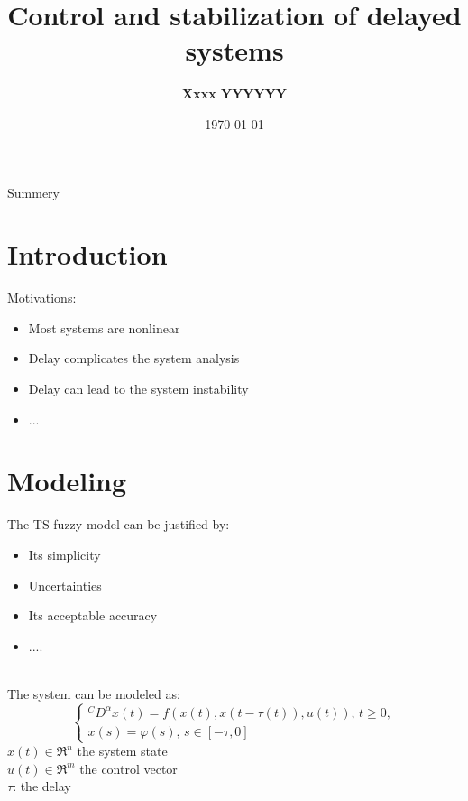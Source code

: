 \documentclass[dvipsnames,mathserif]{beamer}
\begin{document}
\rightskip\rightmargin
\title{Control and stabilization of delayed systems  }
\author{ \Large \textbf{Xxxx YYYYYY} }
\footnotesize{\date{\today }


\begin{frame}
\maketitle
\end{frame}

\begin{frame}{ Summery}
\footnotesize \tableofcontents
\end{frame}

\section{Introduction}
\begin{frame}
\large Motivations:
\begin{itemize}
    \item Most systems are nonlinear
    
    \item Delay complicates the system analysis
   
    \item Delay can lead to the system instability
    
    \item ...    
\end{itemize}
\end{frame}
\section{Modeling}
\begin{frame}
\footnotesize
The TS fuzzy model can be justified by:
\begin{itemize}
    \item Its simplicity
    \item Uncertainties  
    \item Its acceptable accuracy
    \item ....
\end{itemize}
  \pause
\quad \\
The system can be modeled as: 
\begin{equation*}
\left\{\begin{array}{l}
{ }^C D^\alpha x(t)=f(x(t),x(t-\tau(t)),u(t)),\, t \geq 0, \\
x(s)=\varphi(s),\, s \in[-\tau, 0]
\end{array}\right.
\end{equation*}
$x(t) \in \Re ^{n}$ the system state\\
$u(t) \in \Re ^{m}$ the control vector \\
$\tau$: the delay
\end{frame}

}
\end{document}
